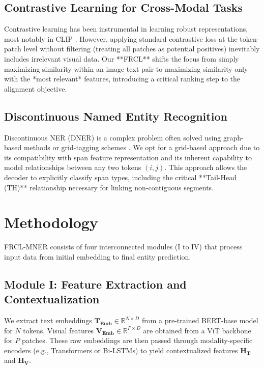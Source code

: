 \documentclass[runningheads]{llncs}
\begin{document}
\subsection{Contrastive Learning for Cross-Modal Tasks}
Contrastive learning has been instrumental in learning robust representations, most notably in CLIP \cite{radford2021clip}. However, applying standard contrastive loss at the token-patch level without filtering (treating all patches as potential positives) inevitably includes irrelevant visual data. Our **FRCL** shifts the focus from simply maximizing similarity within an image-text pair to maximizing similarity only with the *most relevant* features, introducing a critical ranking step to the alignment objective.

\subsection{Discontinuous Named Entity Recognition}
Discontinuous NER (DNER) is a complex problem often solved using graph-based methods \cite{yu2020span} or grid-tagging schemes \cite{li2022gner}. We opt for a grid-based approach due to its compatibility with span feature representation and its inherent capability to model relationships between any two tokens $(i, j)$. This approach allows the decoder to explicitly classify span types, including the critical **Tail-Head (TH)** relationship necessary for linking non-contiguous segments.

\section{Methodology}

FRCL-MNER consists of four interconnected modules (I to IV) that process input data from initial embedding to final entity prediction.

\subsection{Module I: Feature Extraction and Contextualization}
We extract text embeddings $\mathbf{T_{Emb}} \in \mathbb{R}^{N \times D}$ from a pre-trained BERT-base model for $N$ tokens. Visual features $\mathbf{V_{Emb}} \in \mathbb{R}^{P \times D}$ are obtained from a ViT backbone for $P$ patches. These raw embeddings are then passed through modality-specific encoders (e.g., Transformers or Bi-LSTMs) to yield contextualized features $\mathbf{H_T}$ and $\mathbf{H_V}$.
\end{document}
